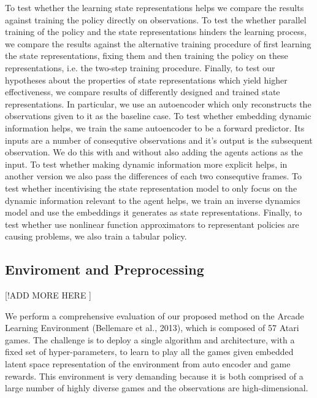 To test whether the learning state representations helps we compare the results
against training the policy directly on observations.
To test the whether parallel training of the policy and the state representations
hinders the learning process, we compare the results against the alternative training procedure
of first learning the state representations,
fixing them and then training the policy on these representations, i.e. the two-step training procedure.
Finally, to test our hypotheses about the properties of state representations which yield
higher effectiveness, we compare results of differently designed and trained state representations.
In particular, we use an autoencoder which only reconstructs the observations given to it
as the baseline case.
To test whether embedding dynamic information helps, we train the same autoencoder to
be a forward predictor. Its inputs are a number of consequtive observations and it's output 
is the subsequent observation.
We do this with and without also adding the agents actions as the input.
To test whether making dynamic information more explicit helps,
in another version we also pass the differences of each two consequtive frames.
To test whether incentivising the state representation model to only focus on the
dynamic information relevant to the agent helps, we train an inverse dynamics model and
use the embeddings it generates as state representations.
Finally, to test whether use nonlinear function approximators
to representant policies are causing problems, we also train a tabular policy.




\subsection{Enviroment and Preprocessing}
[!ADD MORE HERE ]

We perform a comprehensive evaluation of our 
proposed method on the Arcade Learning Environment (Bellemare et al., 2013), 
which is composed of 57 Atari games. 
The challenge is to deploy a single algorithm and architecture, 
with a fixed set of hyper-parameters, 
to learn to play all the games given embedded latent space 
representation of the environment from auto encoder and game rewards. 
This environment is very demanding because it is both 
comprised of a large number of highly diverse games and the observations are high-dimensional.


